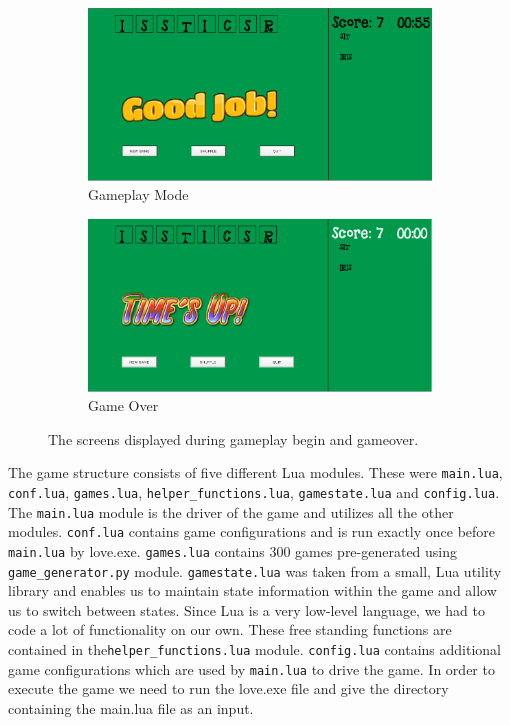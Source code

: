 \begin{figure}
    \centering
    \begin{subfigure}{0.49\textwidth}
        \includegraphics[width=\textwidth]{../screenshots/luagameplay.png}
        \caption{Gameplay Mode}
        \label{luagameplay}
    \end{subfigure}
    \begin{subfigure}{0.49\textwidth}
        \includegraphics[width=\textwidth]{../screenshots/luagameover.png}
        \caption{Game Over}
        \label{luagameover}
    \end{subfigure}
    \caption{The screens displayed during gameplay begin and gameover.}
    \label{luascreenshots2}
\end{figure}


	The game structure consists of five different Lua modules. These were \texttt{main.lua}, \texttt{conf.lua}, \texttt{games.lua},  \texttt{helper\_functions.lua}, \texttt{gamestate.lua} and \texttt{config.lua}. The \texttt{main.lua} module is the driver of the game and utilizes all the other modules. \texttt{conf.lua} contains game configurations and is run exactly once before \texttt{main.lua} by love.exe. \texttt{games.lua} contains 300 games pre-generated using \texttt{game\_generator.py} module. \texttt{gamestate.lua} was taken from  a small, Lua utility library and enables us to maintain state information within the game and allow us to switch between states. Since Lua is a very low-level language, we had to code a lot of functionality on our own. These free standing functions are contained in the\texttt{helper\_functions.lua} module. \texttt{config.lua} contains additional game configurations which are used by \texttt{main.lua} to drive the game. In order to execute the game we need to run the love.exe file and give the directory containing the main.lua file as an input.

